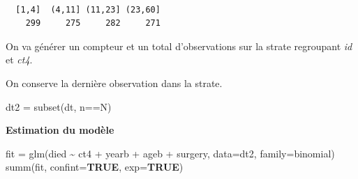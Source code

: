 \documentclass[
  12pt,
  letterpaper,
  DIV=11,
  numbers=noendperiod,
  onepage,
  openany]{scrreprt}
\newenvironment{Shaded}{\begin{snugshade}}{\end{snugshade}}
\newcommand{\AttributeTok}[1]{\textcolor[rgb]{0.80,0.80,0.80}{#1}}
\newcommand{\ConstantTok}[1]{\textcolor[rgb]{0.86,0.64,0.64}{\textbf{#1}}}
\newcommand{\FunctionTok}[1]{\textcolor[rgb]{0.94,0.94,0.56}{#1}}
\newcommand{\NormalTok}[1]{\textcolor[rgb]{0.80,0.80,0.80}{#1}}
\newcommand{\OtherTok}[1]{\textcolor[rgb]{0.94,0.94,0.56}{#1}}
\newcommand{\SpecialCharTok}[1]{\textcolor[rgb]{0.86,0.64,0.64}{#1}}
\begin{document}
\begin{verbatim}

  [1,4]  (4,11] (11,23] (23,60] 
    299     275     282     271 
\end{verbatim}

On va générer un compteur et un total d'observations sur la strate
regroupant \emph{id} et \emph{ct4}.

\begin{Shaded}
\end{Shaded}

On conserve la dernière observation dans la strate.

\begin{Shaded}
\begin{Highlighting}[]
\NormalTok{dt2 }\OtherTok{=} \FunctionTok{subset}\NormalTok{(dt, n}\SpecialCharTok{==}\NormalTok{N)}
\end{Highlighting}
\end{Shaded}

\textbf{Estimation du modèle}

\begin{Shaded}
\begin{Highlighting}[]
\NormalTok{fit }\OtherTok{=} \FunctionTok{glm}\NormalTok{(died }\SpecialCharTok{\textasciitilde{}}\NormalTok{ ct4 }\SpecialCharTok{+}\NormalTok{ yearb }\SpecialCharTok{+}\NormalTok{ ageb }\SpecialCharTok{+}\NormalTok{ surgery, }\AttributeTok{data=}\NormalTok{dt2, }\AttributeTok{family=}\NormalTok{binomial)}
\FunctionTok{summ}\NormalTok{(fit, }\AttributeTok{confint=}\ConstantTok{TRUE}\NormalTok{, }\AttributeTok{exp=}\ConstantTok{TRUE}\NormalTok{)}
\end{Highlighting}
\end{Shaded}
\end{document}
